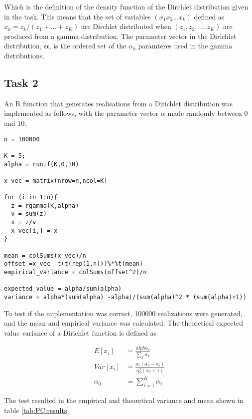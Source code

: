 Which is the definition of the density function of the Dirchlet distribution given in the task. This means that the set of variables $(x_1 x_2 ... x_k)$ defined as $x_k = z_k / (z_1 + ... + z_K)$ are Dirchlet distributed when $(z_1, z_2, ... , z_K)$ are produced from a gamma distribution. The parameter vector in the Dirichlet distribution, $\mathbf{\alpha}$, is the ordered set of the $\alpha_k$ paramteres used in the gamma distributions.


\subsection{Task 2}

An R function that generates realisations from a Dirichlet distribution was implemented as follows, with the parameter vector $\alpha$ made randomly between 0 and 10. 


\begin{lstlisting}
n = 100000

K = 5;
alpha = runif(K,0,10)

x_vec = matrix(nrow=n,ncol=K)

for (i in 1:n){
  z = rgamma(K,alpha)
  v = sum(z)
  x = z/v
  x_vec[i,] = x
}

mean = colSums(x_vec)/n
offset =x_vec- t(t(rep(1,n)))%*%t(mean)
empirical_variance = colSums(offset^2)/n

expected_value = alpha/sum(alpha)
variance = alpha*(sum(alpha) -alpha)/(sum(alpha)^2 * (sum(alpha)+1)) 
\end{lstlisting}

To test if the implementation was correct, 100000 realizations were generated, and the mean and empirical variance was calculated. The theoretical expected value variance of a Dirichlet function is defined as 

\begin{align}
    E[x_i] &= \frac{alpha_i}{\sum_k \alpha_k}\\
    Var[x_i] &= \frac{\alpha_i (\alpha_0 - \alpha_i)}{\alpha_0^2 (\alpha_0 + 1)}\\
    \alpha_0 &= \sum_{i=1}^{K} \alpha_i
\end{align}

The test resulted in the empirical and theoretical variance and mean shown in table \ref{tab:PC:results}.

